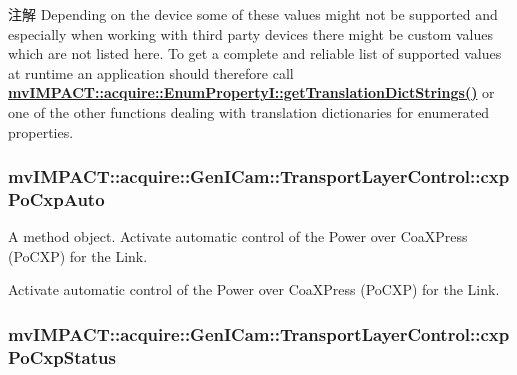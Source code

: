 \begin{DoxyNote}{注解}
Depending on the device some of these values might not be supported and especially when working with third party devices there might be custom values which are not listed here. To get a complete and reliable list of supported values at runtime an application should therefore call {\bfseries \hyperlink{classmv_i_m_p_a_c_t_1_1acquire_1_1_enum_property_i_a0ba6ccbf5ee69784d5d0b537924d26b6}{mv\+I\+M\+P\+A\+C\+T\+::acquire\+::\+Enum\+Property\+I\+::get\+Translation\+Dict\+Strings()}} or one of the other functions dealing with translation dictionaries for enumerated properties. 
\end{DoxyNote}
\hypertarget{classmv_i_m_p_a_c_t_1_1acquire_1_1_gen_i_cam_1_1_transport_layer_control_ae9d8d9034b0e8625ee58c7af260e02d8}{
\subsubsection[{cxp\+Po\+Cxp\+Auto}]{ mv\+I\+M\+P\+A\+C\+T\+::acquire\+::\+Gen\+I\+Cam\+::\+Transport\+Layer\+Control\+::cxp\+Po\+Cxp\+Auto}}\label{classmv_i_m_p_a_c_t_1_1acquire_1_1_gen_i_cam_1_1_transport_layer_control_ae9d8d9034b0e8625ee58c7af260e02d8}


A method object. Activate automatic control of the Power over Coa\+X\+Press (Po\+C\+X\+P) for the Link. 

Activate automatic control of the Power over Coa\+X\+Press (Po\+C\+X\+P) for the Link. \hypertarget{classmv_i_m_p_a_c_t_1_1acquire_1_1_gen_i_cam_1_1_transport_layer_control_a1e37e452ded0cff7e6586ee0e71fe42b}{
\subsubsection[{cxp\+Po\+Cxp\+Status}]{ mv\+I\+M\+P\+A\+C\+T\+::acquire\+::\+Gen\+I\+Cam\+::\+Transport\+Layer\+Control\+::cxp\+Po\+Cxp\+Status}}\label{classmv_i_m_p_a_c_t_1_1acquire_1_1_gen_i_cam_1_1_transport_layer_control_a1e37e452ded0cff7e6586ee0e71fe42b}


